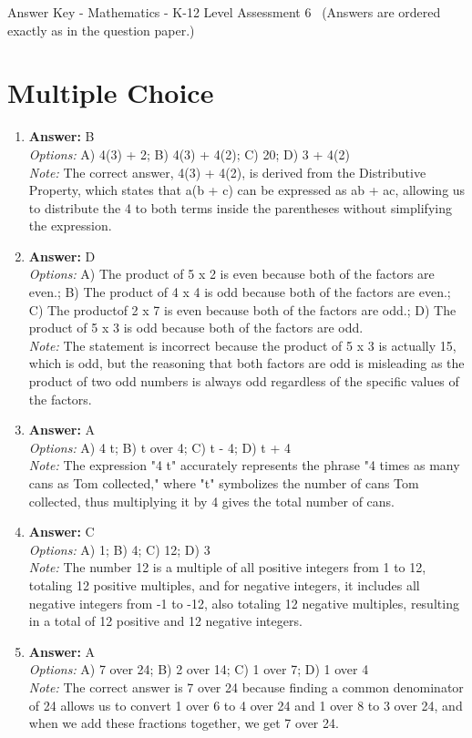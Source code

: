 \documentclass[12pt]{article}
\begin{document}
\begin{center}
Answer Key - Mathematics - K-12 Level Assessment 6 \
\small (Answers are ordered exactly as in the question paper.)
\end{center}

\section*{Multiple Choice}
\begin{enumerate}[label=\arabic*.]
\item \textbf{Answer:} B
\\ \textit{Options:} A) 4(3) + 2; B) 4(3) + 4(2); C) 20; D) 3 + 4(2)
\\ \textit{Note:} The correct answer, 4(3) + 4(2), is derived from the Distributive Property, which states that a(b + c) can be expressed as ab + ac, allowing us to distribute the 4 to both terms inside the parentheses without simplifying the expression.
\item \textbf{Answer:} D
\\ \textit{Options:} A) The product of 5 x 2 is even because both of the factors are even.; B) The product of 4 x 4 is odd because both of the factors are even.; C) The productof 2 x 7 is even because both of the factors are odd.; D) The product of 5 x 3 is odd because both of the factors are odd.
\\ \textit{Note:} The statement is incorrect because the product of 5 x 3 is actually 15, which is odd, but the reasoning that both factors are odd is misleading as the product of two odd numbers is always odd regardless of the specific values of the factors.
\item \textbf{Answer:} A
\\ \textit{Options:} A) 4 t; B) t over 4; C) t - 4; D) t + 4
\\ \textit{Note:} The expression "4 t" accurately represents the phrase "4 times as many cans as Tom collected," where "t" symbolizes the number of cans Tom collected, thus multiplying it by 4 gives the total number of cans.
\item \textbf{Answer:} C
\\ \textit{Options:} A) 1; B) 4; C) 12; D) 3
\\ \textit{Note:} The number 12 is a multiple of all positive integers from 1 to 12, totaling 12 positive multiples, and for negative integers, it includes all negative integers from -1 to -12, also totaling 12 negative multiples, resulting in a total of 12 positive and 12 negative integers.
\item \textbf{Answer:} A
\\ \textit{Options:} A) 7 over 24; B) 2 over 14; C) 1 over 7; D) 1 over 4
\\ \textit{Note:} The correct answer is 7 over 24 because finding a common denominator of 24 allows us to convert 1 over 6 to 4 over 24 and 1 over 8 to 3 over 24, and when we add these fractions together, we get 7 over 24.
\end{enumerate}
\end{document}
